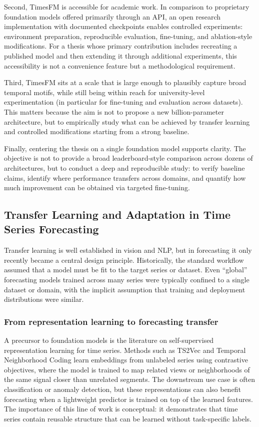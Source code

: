 Second, TimesFM is accessible for academic work. In comparison to proprietary foundation models offered primarily through an API, an open research implementation with documented checkpoints enables controlled experiments: environment preparation, reproducible evaluation, fine-tuning, and ablation-style modifications. For a thesis whose primary contribution includes recreating a published model and then extending it through additional experiments, this accessibility is not a convenience feature but a methodological requirement.

Third, TimesFM sits at a scale that is large enough to plausibly capture broad temporal motifs, while still being within reach for university-level experimentation (in particular for fine-tuning and evaluation across datasets). This matters because the aim is not to propose a new billion-parameter architecture, but to empirically study what can be achieved by transfer learning and controlled modifications starting from a strong baseline.

Finally, centering the thesis on a single foundation model supports clarity. The objective is not to provide a broad leaderboard-style comparison across dozens of architectures, but to conduct a deep and reproducible study: to verify baseline claims, identify where performance transfers across domains, and quantify how much improvement can be obtained via targeted fine-tuning.

\subsection{Transfer Learning and Adaptation in Time Series Forecasting}

Transfer learning is well established in vision and NLP, but in forecasting it only recently became a central design principle. Historically, the standard workflow assumed that a model must be fit to the target series or dataset. Even ``global'' forecasting models trained across many series were typically confined to a single dataset or domain, with the implicit assumption that training and deployment distributions were similar.

\subsubsection{From representation learning to forecasting transfer}
A precursor to foundation models is the literature on self-supervised representation learning for time series. Methods such as TS2Vec and Temporal Neighborhood Coding learn embeddings from unlabeled series using contrastive objectives, where the model is trained to map related views or neighborhoods of the same signal closer than unrelated segments. The downstream use case is often classification or anomaly detection, but these representations can also benefit forecasting when a lightweight predictor is trained on top of the learned features. The importance of this line of work is conceptual: it demonstrates that time series contain reusable structure that can be learned without task-specific labels.

